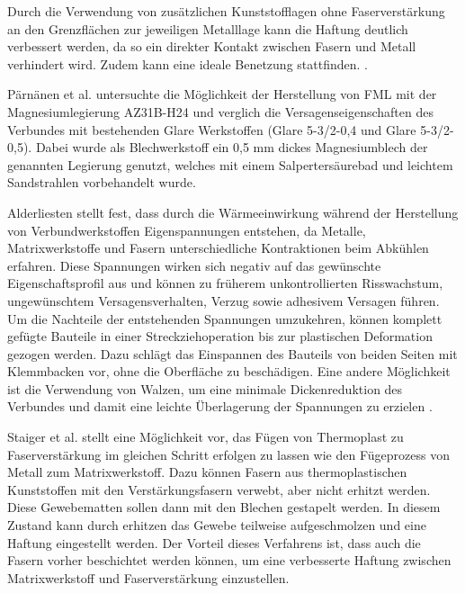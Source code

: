  

Durch die Verwendung von zusätzlichen Kunststofflagen ohne Faserverstärkung an den Grenzflächen zur jeweiligen Metalllage kann die Haftung deutlich verbessert werden, da so ein direkter Kontakt zwischen Fasern und Metall verhindert wird. Zudem kann eine ideale Benetzung stattfinden. \cite{Marissen.1988}.



Pärnänen et al.\cite{Parnanen.2012} untersuchte die Möglichkeit der Herstellung von FML mit der Magnesiumlegierung AZ31B-H24 und verglich die Versagenseigenschaften des Verbundes mit bestehenden Glare Werkstoffen (Glare 5-3/2-0,4 und Glare 5-3/2-0,5). Dabei wurde als Blechwerkstoff ein 0,5 mm dickes Magnesiumblech der genannten Legierung genutzt, welches mit einem Salpertersäurebad und leichtem Sandstrahlen vorbehandelt wurde. 

Alderliesten \cite{Alderliesten.2009} stellt fest, dass durch die Wärmeeinwirkung während der Herstellung von Verbundwerkstoffen Eigenspannungen entstehen, da Metalle, Matrixwerkstoffe und Fasern unterschiedliche Kontraktionen beim Abkühlen erfahren. Diese Spannungen wirken sich negativ auf das gewünschte Eigenschaftsprofil aus und können zu früherem unkontrollierten Risswachstum, ungewünschtem Versagensverhalten, Verzug sowie adhesivem Versagen führen. Um die Nachteile der entstehenden Spannungen umzukehren, können komplett gefügte Bauteile in einer Streckziehoperation bis zur plastischen Deformation gezogen werden. Dazu schlägt \cite{Delft.1} das Einspannen des Bauteils von beiden Seiten mit Klemmbacken vor, ohne die Oberfläche zu beschädigen. Eine andere Möglichkeit ist die Verwendung von Walzen, um eine minimale Dickenreduktion des Verbundes und damit eine leichte Überlagerung der Spannungen zu erzielen \cite{Vogelesang.1989}. 

Staiger et al. \cite{Staiger.2014} stellt eine Möglichkeit vor, das Fügen von Thermoplast zu Faserverstärkung im gleichen Schritt erfolgen zu lassen wie den Fügeprozess von Metall zum Matrixwerkstoff. Dazu können Fasern aus thermoplastischen Kunststoffen mit den Verstärkungsfasern verwebt, aber nicht erhitzt werden. Diese Gewebematten sollen dann mit den Blechen gestapelt werden. In diesem Zustand kann durch erhitzen das Gewebe teilweise aufgeschmolzen und eine Haftung eingestellt werden. Der Vorteil dieses Verfahrens ist, dass auch die Fasern vorher beschichtet werden können, um eine verbesserte Haftung zwischen Matrixwerkstoff und Faserverstärkung einzustellen.



